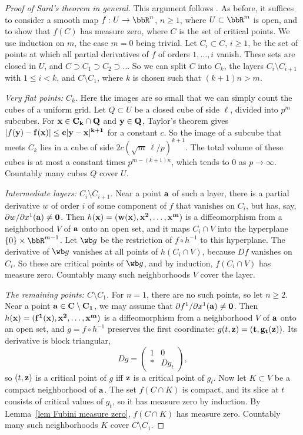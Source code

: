 \begin{proof}[Proof of Sard's theorem in general]
    This argument follows \cite[\S3]{MilnorTDV}. As before, it suffices to consider a smooth map $f:U\to\bbR^n$, $n\geq1$, where $U\subset\bbR^m$ is open, and to show that $f(C)$ has measure zero, where $C$ is the set of critical points. We use induction on $m$, the case $m=0$ being trivial. Let $C_i\subset C$, $i\geq1$, be the set of points at which all partial derivatives of $f$ of orders $1,\ldots,i$ vanish. These sets are closed in $U$, and $C\supset C_1\supset C_2\supset\ldots$ So we can split $C$ into $C_k$, the layers $C_i\setminus C_{i+1}$ with $1\leq i<k$, and $C\setminus C_1$, where $k$ is chosen such that $(k+1)n>m$.

    \emph{Very flat points: $C_k$.} Here the images are so small that we can simply count the cubes of a uniform grid. Let $Q\subset U$ be a closed cube of side $\ell$, divided into $p^m$ subcubes. For $\bf{x}\in C_k\cap Q$ and $\bf{y}\in Q$, Taylor's theorem gives $\lvert f(\bf{y})-f(\bf{x})\rvert\leq c\lvert\bf{y}-\bf{x}\rvert^{k+1}$ for a constant $c$. So the image of a subcube that meets $C_k$ lies in a cube of side $2c(\sqrt m\,\ell/p)^{k+1}$. The total volume of these cubes is at most a constant times $p^{m-(k+1)n}$, which tends to $0$ as $p\to\infty$. Countably many cubes $Q$ cover $U$.

    \emph{Intermediate layers: $C_i\setminus C_{i+1}$.} Near a point $\bf{a}$ of such a layer, there is a partial derivative $w$ of order $i$ of some component of $f$ that vanishes on $C_i$, but has, say, $\partial w/\partial x^1(\bf{a})\neq0$. Then $h(\bf{x})=(w(\bf{x}),x^2,\ldots,x^m)$ is a diffeomorphism from a neighborhood $V$ of $\bf{a}$ onto an open set, and it maps $C_i\cap V$ into the hyperplane $\{0\}\times\bbR^{m-1}$. Let $\wb g$ be the restriction of $f\circ h^{-1}$ to this hyperplane. The derivative of $\wb g$ vanishes at all points of $h(C_i\cap V)$, because $Df$ vanishes on $C_i$. So these are critical points of $\wb g$, and by induction, $f(C_i\cap V)$ has measure zero. Countably many such neighborhoods $V$ cover the layer.

    \emph{The remaining points: $C\setminus C_1$.} For $n=1$, there are no such points, so let $n\geq2$. Near a point $\bf{a}\in C\setminus C_1$, we may assume that $\partial f^1/\partial x^1(\bf{a})\neq0$. Then $h(\bf{x})=(f^1(\bf{x}),x^2,\ldots,x^m)$ is a diffeomorphism from a neighborhood $V$ of $\bf{a}$ onto an open set, and $g=f\circ h^{-1}$ preserves the first coordinate: $g(t,\bf{z})=(t,g_t(\bf{z}))$. Its derivative is block triangular,
    \[Dg=\begin{pmatrix}1&0\\ \ast&Dg_t\end{pmatrix},\]
    so $(t,\bf{z})$ is a critical point of $g$ iff $\bf{z}$ is a critical point of $g_t$. Now let $K\subset V$ be a compact neighborhood of $\bf{a}$. The set $f(C\cap K)$ is compact, and its slice at $t$ consists of critical values of $g_t$, so it has measure zero by induction. By Lemma~\ref{lem Fubini measure zero}, $f(C\cap K)$ has measure zero. Countably many such neighborhoods $K$ cover $C\setminus C_1$.
\end{proof}

